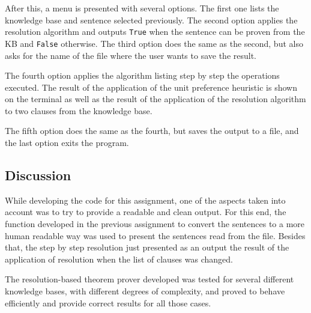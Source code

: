 \documentclass[11pt,journal,compsoc]{IEEEtran}
\begin{document}
After this, a menu is presented with several options. The first one lists the knowledge base and sentence selected previously. The second option applies the resolution algorithm and outputs \texttt{True} when the sentence can be proven from the KB and \texttt{False} otherwise. The third option does the same as the second, but also asks for the name of the file where the user wants to save the result.

The fourth option applies the algorithm listing step by step the operations executed. The result of the application of the unit preference heuristic is shown on the terminal as well as the result of the application of the resolution algorithm to two clauses from the knowledge base.

The fifth option does the same as the fourth, but saves the output to a file, and the last option exits the program.


\subsection{Discussion}

While developing the code for this assignment, one of the aspects taken into account was to try to provide a readable and clean output. For this end, the function developed in the previous assignment to convert the sentences to a more human readable way was used to present the sentences read from the file. Besides that, the step by step resolution just presented as an output the result of the application of resolution when the list of clauses was changed.

The resolution-based theorem prover developed was tested for several different knowledge bases, with different degrees of complexity, and proved to behave efficiently and provide correct results for all those cases.




%
%
%
\end{document}
